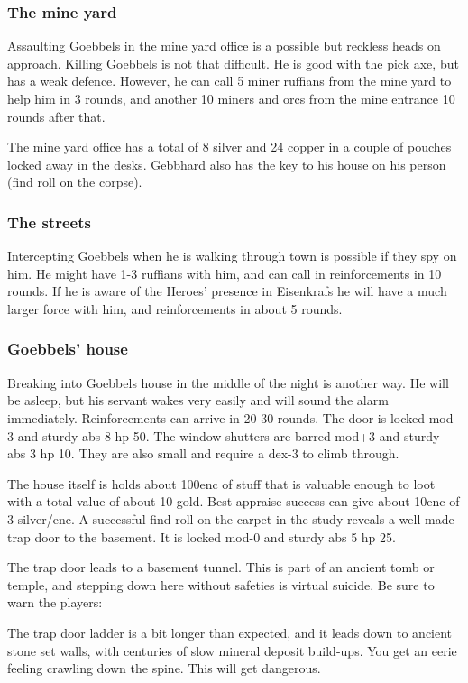 \subsubsection*{The mine yard}
Assaulting Goebbels in the mine yard office is a possible but reckless heads on approach. Killing Goebbels is not that difficult. He is good with the pick axe, but has a weak defence. However, he can call 5 miner ruffians from the mine yard to help him in 3 rounds, and another 10 miners and orcs from the mine entrance 10 rounds after that.

The mine yard office has a total of 8 silver and 24 copper in a couple of pouches locked away in the desks.
Gebbhard also has the key to his house on his person (find roll on the corpse).


\subsubsection*{The streets}
Intercepting Goebbels when he is walking through town is possible if they spy on him. He might have 1-3 ruffians with him, and can call in reinforcements in 10 rounds. If he is aware of the Heroes' presence in Eisenkrafs he will have a much larger force with him, and reinforcements in about 5 rounds.


\subsubsection*{Goebbels' house}
Breaking into Goebbels house in the middle of the night is another way. He will be asleep, but his servant wakes very easily and will sound the alarm immediately. Reinforcements can arrive in 20-30 rounds.
The door is locked mod-3 and sturdy abs 8 hp 50. The window shutters are barred mod+3 and sturdy abs 3 hp 10. They are also small and require a dex-3 to climb through.

The house itself is holds about 100enc of stuff that is valuable enough to loot with a total value of about 10 gold. Best appraise success can give about 10enc of 3 silver/enc.
A successful find roll on the carpet in the study reveals a well made trap door to the basement. It is locked mod-0 and sturdy abs 5 hp 25.

The trap door leads to a basement tunnel. This is part of an ancient tomb or temple, and stepping down here without safeties is virtual suicide. Be sure to warn the players:
\begin{readoutloud}
The trap door ladder is a bit longer than expected, and it leads down to ancient stone set walls, with centuries of slow mineral deposit build-ups. You get an eerie feeling crawling down the spine. This will get dangerous.
\end{readoutloud}


